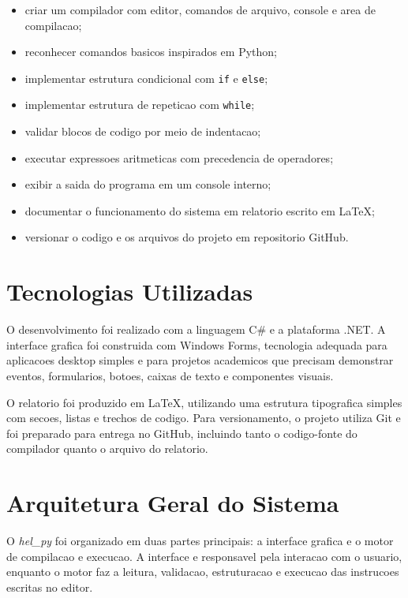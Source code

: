 \documentclass[12pt,a4paper]{article}
\begin{document}
\begin{itemize}
    \item criar um compilador com editor, comandos de arquivo, console e area de compilacao;
    \item reconhecer comandos basicos inspirados em Python;
    \item implementar estrutura condicional com \texttt{if} e \texttt{else};
    \item implementar estrutura de repeticao com \texttt{while};
    \item validar blocos de codigo por meio de indentacao;
    \item executar expressoes aritmeticas com precedencia de operadores;
    \item exibir a saida do programa em um console interno;
    \item documentar o funcionamento do sistema em relatorio escrito em LaTeX;
    \item versionar o codigo e os arquivos do projeto em repositorio GitHub.
\end{itemize}

\section{Tecnologias Utilizadas}

O desenvolvimento foi realizado com a linguagem C\# e a plataforma .NET. A interface grafica foi construida com Windows Forms, tecnologia adequada para aplicacoes desktop simples e para projetos academicos que precisam demonstrar eventos, formularios, botoes, caixas de texto e componentes visuais.

O relatorio foi produzido em LaTeX, utilizando uma estrutura tipografica simples com secoes, listas e trechos de codigo. Para versionamento, o projeto utiliza Git e foi preparado para entrega no GitHub, incluindo tanto o codigo-fonte do compilador quanto o arquivo do relatorio.

\section{Arquitetura Geral do Sistema}

O \textit{hel\_py} foi organizado em duas partes principais: a interface grafica e o motor de compilacao e execucao. A interface e responsavel pela interacao com o usuario, enquanto o motor faz a leitura, validacao, estruturacao e execucao das instrucoes escritas no editor.
\end{document}
